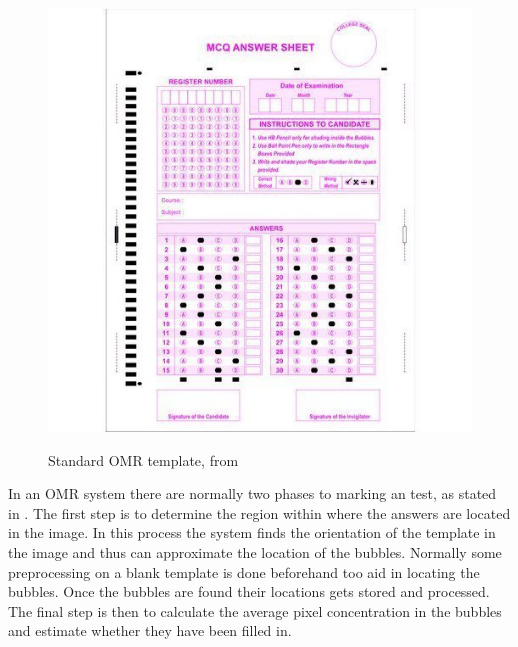 \begin{figure}
  \centering
  \includegraphics[width=14cm]{omrTemplate}\\
  \caption{Standard OMR template, from \citet{stdTemplate}}%
  \label{fig:omrTemplate}
\end{figure}

In an OMR system there are normally two phases to marking an test, as stated in \citet{DraganI2003}. The first step is to determine the region within where the answers are located in the image. In this process the system finds the orientation of the template in the image and thus can approximate the location of the bubbles. Normally some preprocessing on a blank template is done beforehand too aid in locating the bubbles. Once the bubbles are found their locations gets stored and processed. The final step is then to calculate the average pixel concentration in the bubbles and estimate whether they have been filled in.

